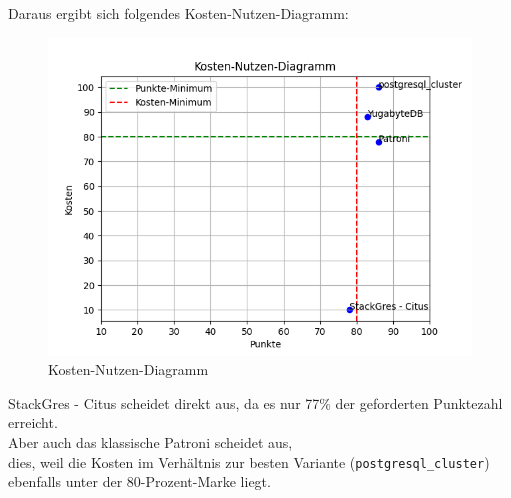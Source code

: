 \clearpage
\begin{flushleft}
    Daraus ergibt sich folgendes Kosten-Nutzen-Diagramm:
    \begin{figure}[H]
        \centering
        \includegraphics[width=1\linewidth]{source/cost_benefit_diagram/cost_benefit_diagram}
        \caption{Kosten-Nutzen-Diagramm}
        \label{fig:cost_benefit_diagram}
    \end{figure}
    StackGres - Citus scheidet direkt aus, da es nur 77\% der geforderten Punktezahl erreicht.\\
    Aber auch das klassische Patroni scheidet aus,\\
    dies, weil die Kosten im Verhältnis zur besten Variante (\texttt{postgresql\_cluster}) ebenfalls unter der 80-Prozent-Marke liegt.
\end{flushleft}